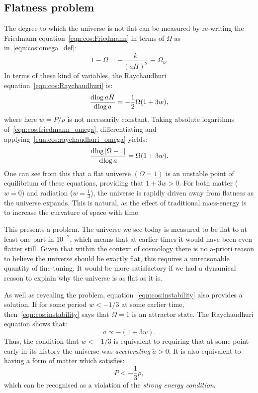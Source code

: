 \subsection{Flatness problem}
The degree to which the universe is not flat can be measured by re-writing the Friedmann equation~\eqref{eqn:cos:Friedmann} in terms of $\Omega$ as in~\eqref{eqn:cos:omega_def}:
\begin{equation}
  1-\Omega = -\frac{k}{{(aH)}^2} \equiv \Omega_k.
  \label{eqn:cos:friedmann_omega}
\end{equation}
In terms of these kind of variables, the Raychaudhuri equation~\eqref{eqn:cos:Raychaudhuri} is:
\begin{equation}
  \frac{\operatorname{d}^{}\!{\log aH}}{\operatorname{d}^{}\!{\log a} } = -\frac{1}{2}\Omega(1+3w),
  \label{eqn:cos:raychaudhuri_omega}
\end{equation}
where here $w=P/\rho$ is not necessarily constant.
Taking absolute logarithms of~\eqref{eqn:cos:friedmann_omega}, differentiating and applying~\eqref{eqn:cos:raychaudhuri_omega} yields:
\begin{equation}
  \frac{\operatorname{d}^{}\!{\log |\Omega-1|}}{\operatorname{d}^{}\!{\log a} } = \Omega(1+3w).
  \label{eqn:cos:instability}
\end{equation}
One can see from this that a flat universe $(\Omega=1)$ is an unstable point of equilibrium of these equations, providing that $1+3w>0$. For both matter (${w=0}$) and radiation (${w=\frac{1}{3}}$), the universe is rapidly driven away from flatness as the universe expands. This is natural, as the effect of traditional mass-energy is to increase the curvature of space with time

This presents a problem. The universe we see today is measured to be flat to at least one part in $10^{-2}$, which means that at earlier times it would have been even flatter still. Given that within the context of cosmology there is no a-priori reason to believe the universe should be exactly flat, this requires a unreasonable quantity of fine tuning. It would be more satisfactory if we had a dynamical reason to explain why the universe is as flat as it is.

As well as revealing the problem, equation~\eqref{eqn:cos:instability} also provides a solution. If for some period $w<-1/3$ at some earlier time, then~\eqref{eqn:cos:instability} says that $\Omega=1$ is an attractor state. The Raychaudhuri equation shows that:
\begin{equation}
  \ddot{a} \propto -(1+3w).
  \label{eqn:cos:Raychaudhuri_acc}
\end{equation}
Thus, the condition that $w<-1/3$ is equivalent to requiring that at some point early in its history the universe was {\em accelerating\/} $\ddot{a}>0$. It is also equivalent to having a form of matter which satisfies:
\begin{equation}
  P < -\frac{1}{3}\rho,
  \label{eqn:cos:SEC_violation}
\end{equation}
which can be recognised as a violation of the {\em strong energy condition}.

